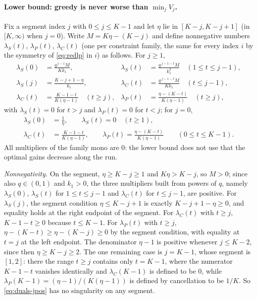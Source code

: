 \paragraph{Lower bound: greedy is never worse than $\min_jV_j$.}
Fix a segment index $j$ with $0\le j\le K-1$ and let $\eta$ lie in
$[K-j,K-j+1]$ (in $[K,\infty)$ when $j=0$).  Write $M=K\eta-(K-j)$ and define
nonnegative numbers $\lambda_S(t)$, $\lambda_P(t)$, $\lambda_C(t)$ (one per
constraint family, the same for every index $i$ by the symmetry of
\eqref{eq:redlp} in $i$) as follows.  For $j\ge1$,
\begin{equation}\label{eq:duals-jpos}
\begin{aligned}
  \lambda_S(0)&=\frac{q^{\,j-1}M}{Kk_1}, &
  \lambda_S(t)&=\frac{q^{\,j-1-t}M}{k_1^{2}}\quad(1\le t\le j-1),\\
  \lambda_S(j)&=\frac{K-j+1-\eta}{k_1}, &
  \lambda_C(t)&=\frac{q^{\,j-1-t}M}{Kk_1}\quad(t\le j-1),\\
  \lambda_C(t)&=\frac{K-1-t}{K(\eta-1)}\quad(t\ge j), &
  \lambda_P(t)&=\frac{\eta-(K-t)}{K(\eta-1)}\quad(t\ge j),
\end{aligned}
\end{equation}
with $\lambda_S(t)=0$ for $t>j$ and $\lambda_P(t)=0$ for $t<j$; for $j=0$,
\begin{equation}\label{eq:duals-jzero}
\begin{aligned}
  \lambda_S(0)&=\frac1\eta,\qquad \lambda_S(t)=0\quad(t\ge1),\\
  \lambda_C(t)&=\frac{K-1-t}{K(\eta-1)},\qquad
  \lambda_P(t)=\frac{\eta-(K-t)}{K(\eta-1)}\qquad(0\le t\le K-1).
\end{aligned}
\end{equation}
All multipliers of the family $\mathrm{mono}$ are $0$: the lower bound does not
use that the optimal gains decrease along the run.

\emph{Nonnegativity.}  On the segment, $\eta\ge K-j\ge1$ and $K\eta>K-j$, so
$M>0$; since also $q\in(0,1)$ and $k_1>0$, the three multipliers built from
powers of $q$, namely $\lambda_S(0)$, $\lambda_S(t)$ for $1\le t\le j-1$ and
$\lambda_C(t)$ for $t\le j-1$, are positive.  For
$\lambda_S(j)$, the segment condition $\eta\le K-j+1$ is exactly
$K-j+1-\eta\ge0$, and equality holds at the right endpoint of the segment.
For $\lambda_C(t)$ with $t\ge j$, $K-1-t\ge0$ because $t\le K-1$.  For
$\lambda_P(t)$ with $t\ge j$, $\eta-(K-t)\ge\eta-(K-j)\ge0$ by the segment
condition, with equality at $t=j$ at the left endpoint.  The denominator
$\eta-1$ is positive whenever $j\le K-2$, since then $\eta\ge K-j\ge2$.  The
one remaining case is $j=K-1$, whose segment is $[1,2]$: there the range
$t\ge j$ contains only $t=K-1$, where the numerator $K-1-t$ vanishes
identically and $\lambda_C(K-1)$ is defined to be $0$, while
$\lambda_P(K-1)=(\eta-1)/(K(\eta-1))$ is defined by cancellation to be $1/K$.
So \eqref{eq:duals-jpos} has no singularity on any segment.

